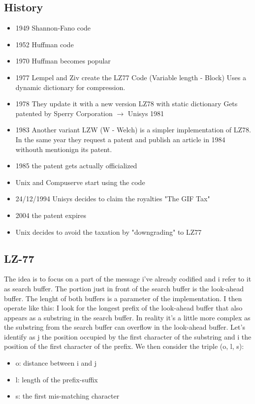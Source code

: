    \subsection{History}
    \begin{itemize}
        \item 1949 Shannon-Fano code
        \item 1952 Huffman code
        \item 1970 Huffman becomes popular
        \item 1977 Lempel and Ziv create the LZ77 Code (Variable length - Block)
        Uses a dynamic dictionary for compression.
        \item 1978 They update it with a new version LZ78 with static dictionary
        Gets patented by Sperry Corporation $\rightarrow$ Unisys 1981
        \item 1983 Another variant LZW (W - Welch) is a simpler implementation of LZ78. In the same year they request a patent and publish an article in 1984 withouth mentionign its patent.
        \item 1985 the patent gets actually officialized
        \item Unix and Compuserve start using the code
        \item 24/12/1994 Unisys decides to claim the royalties "The GIF Tax"
        \item 2004 the patent expires
        \item Unix decides to avoid the taxation by "downgrading" to LZ77
    \end{itemize}
    
    \subsection{LZ-77}
    The idea is to focus on a part of the message i've already codified and i refer to it as search buffer.
    The portion just in front of the search buffer is the look-ahead buffer. The lenght of both buffers is a parameter of the implementation.
    I then operate like this: I look for the longest prefix of the look-ahead buffer that also appears as a substring in the search buffer.
    In reality it's a little more complex as the substring from the search buffer can overflow in the look-ahead buffer.
    Let's identify as j the position occupied by the first character of the substring and i the position of the first character of the prefix.
    We then consider the triple (o, l, s): 
    \begin{itemize}
        \item o: distance between i and j
        \item l: length of the prefix-suffix
        \item s: the first mis-matching character
    \end{itemize}

